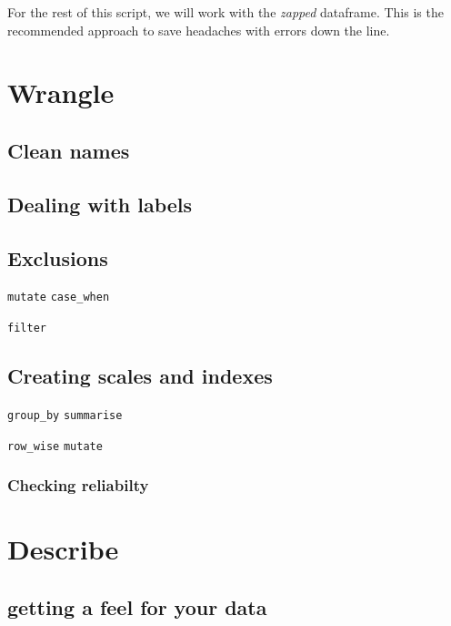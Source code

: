 \documentclass[
  letterpaper,
  DIV=11,
  numbers=noendperiod]{scrreprt}
\begin{document}
For the rest of this script, we will work with the \emph{zapped}
dataframe. This is the recommended approach to save headaches with
errors down the line.


\chapter{Wrangle}\label{wrangle}

\section{Clean names}\label{clean-names}

\section{Dealing with labels}\label{dealing-with-labels}

\section{Exclusions}\label{exclusions}

\texttt{mutate} \texttt{case\_when}

\texttt{filter}

\section{Creating scales and indexes}\label{creating-scales-and-indexes}

\texttt{group\_by} \texttt{summarise}

\texttt{row\_wise} \texttt{mutate}

\subsection{Checking reliabilty}\label{checking-reliabilty}


\chapter{Describe}\label{describe}

\section{getting a feel for your
data}\label{getting-a-feel-for-your-data}
\end{document}
